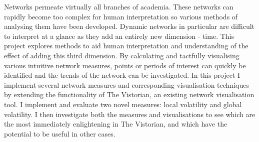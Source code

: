 

\begin{abstracts}

Networks permeate virtually all branches of academia. These networks can rapidly become too complex for human interpretation so various methods of analysing them have been developed. Dynamic networks in particular are difficult to interpret at a glance as they add an entirely new dimension - time. This project explores methods to aid human interpretation and understanding of the effect of adding this third dimension.
By calculating and tactfully visualising various intuitive network measures, points or periods of interest can quickly be identified and the trends of the network can be investigated. In this project I implement several network measures and corresponding visualisation techniques by extending the functionality of The Vistorian, an existing network visualisation tool. I implement and evaluate two novel measures: local volatility and global volatility. I then investigate both the measures and visualisations to see which are the most immediately enlightening in The Vistorian, and which have the potential to be useful in other cases.
\end{abstracts}
